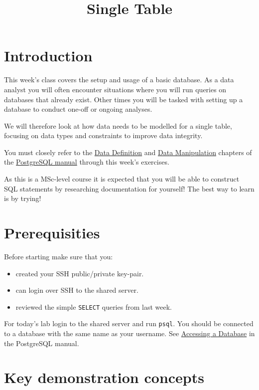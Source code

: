 \documentclass{pgnotes}
\title{Single Table}
\begin{document}
\maketitle

\section{Introduction}
\label{sec:introduction}

This week's class covers the setup and usage of a basic database.
As a data analyst you will often encounter situations where you will run queries on databases that already exist.
Other times you will be tasked with setting up a database to conduct one-off or ongoing analyses.

We will therefore look at how data needs to be modelled for a single table, focusing on data types and constraints to improve data integrity.

You must closely refer to the
\href{https://www.postgresql.org/docs/15/ddl.html}{Data Definition} and
\href{https://www.postgresql.org/docs/15/dml.html}{Data Manipulation}
chapters of the
\href{https://www.postgresql.org/docs/15/index.html}{PostgreSQL manual} through this week's exercises.

As this is a MSc-level course it is expected that you will be able to construct SQL statements by researching documentation for yourself!
The best way to learn is by trying!

\section{Prerequisities}
\label{sec:prerequisities}

Before starting make sure that you:

\begin{itemize}
\item
  created your SSH public/private key-pair.
\item
  can login over SSH to the shared server.
\item
  reviewed the simple \texttt{SELECT} queries from last week.
\end{itemize}

For today's lab login to the shared server and run \texttt{psql}. You
should be connected to a database with the same name as your username.
See
\href{https://www.postgresql.org/docs/14/tutorial-accessdb.html}{Accessing
a Database} in the PostgreSQL manual.

\section{Key demonstration concepts}\label{key-demonstration-concepts}
\end{document}
